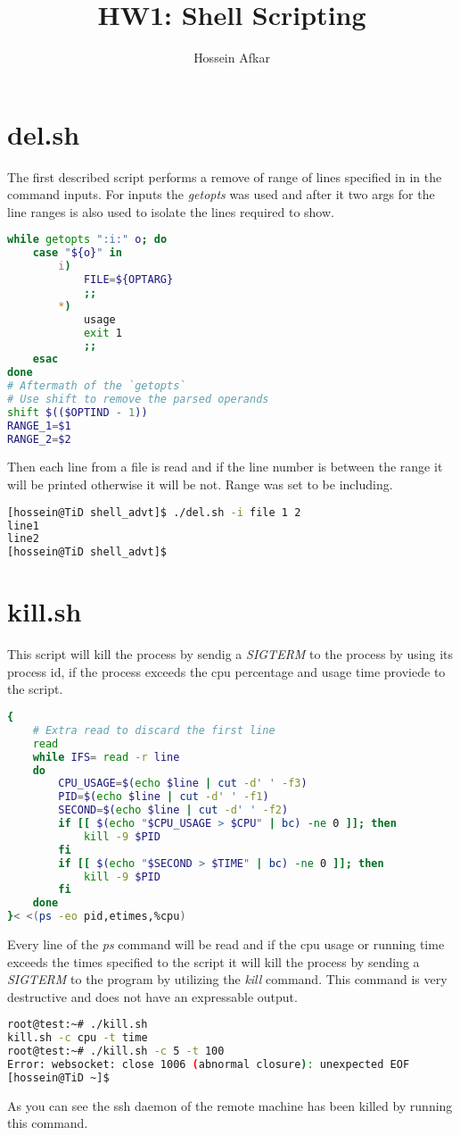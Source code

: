 \documentclass[a4paper, 11pt]{article}
\title{HW1: Shell Scripting}
\author{Hossein Afkar}
\theoremstyle{nonumberplain}
\begin{document}
\maketitle

\section{del.sh}
The first described script performs a remove of range of lines specified
in in the command inputs.
For inputs the \textit{getopts} was used and after it two args for the line
ranges is also used to isolate the lines required to show. \\
\begin{lstlisting}[language=bash]
while getopts ":i:" o; do
    case "${o}" in
        i)
            FILE=${OPTARG}
            ;;
        *)
            usage
            exit 1
            ;;
    esac
done
# Aftermath of the `getopts`
# Use shift to remove the parsed operands
shift $(($OPTIND - 1))
RANGE_1=$1
RANGE_2=$2
\end{lstlisting}
Then each line from a file is read and if the line number is between the range
it will be printed otherwise it will be not.
Range was set to be including.
\begin{lstlisting}[language=bash]
[hossein@TiD shell_advt]$ ./del.sh -i file 1 2
line1
line2
[hossein@TiD shell_advt]$
\end{lstlisting}

\section{kill.sh}
This script will kill the process by sendig a \textit{SIGTERM} to the process
by using its process id, if the process exceeds the cpu percentage and usage
time proviede to the script.
\begin{lstlisting}[language=bash]
{
    # Extra read to discard the first line
    read
    while IFS= read -r line
    do
        CPU_USAGE=$(echo $line | cut -d' ' -f3)
        PID=$(echo $line | cut -d' ' -f1)
        SECOND=$(echo $line | cut -d' ' -f2)
        if [[ $(echo "$CPU_USAGE > $CPU" | bc) -ne 0 ]]; then
            kill -9 $PID
        fi
        if [[ $(echo "$SECOND > $TIME" | bc) -ne 0 ]]; then
            kill -9 $PID
        fi
    done 
}< <(ps -eo pid,etimes,%cpu)

\end{lstlisting}
Every line of the \textit{ps} command will be read and if the cpu usage or
running time exceeds the times specified to the script it will kill the process
by sending a \textit{SIGTERM} to the program by utilizing the \textit{kill}
command.
This command is very destructive and does not have an expressable output.
\begin{lstlisting}[language=bash]
root@test:~# ./kill.sh
kill.sh -c cpu -t time
root@test:~# ./kill.sh -c 5 -t 100
Error: websocket: close 1006 (abnormal closure): unexpected EOF
[hossein@TiD ~]$
\end{lstlisting}
As you can see the ssh daemon of the remote machine has been killed by running
this command.
\end{document}
